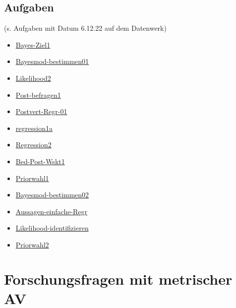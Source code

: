 \documentclass[
  a4paper,
  DIV=11]{scrreprt}
\providecommand{\tightlist}{%
  \setlength{\itemsep}{0pt}\setlength{\parskip}{0pt}}\usepackage{longtable,booktabs,array}
\theoremstyle{definition}
\theoremstyle{remark}
\begin{document}
\hypertarget{aufgaben-7}{%
\section{Aufgaben}\label{aufgaben-7}}

(s. Aufgaben mit Datum 6.12.22 auf dem Datenwerk)

\begin{itemize}
\tightlist
\item
  \href{https://datenwerk.netlify.app/posts/bayes-ziel1/bayes-ziel1}{Bayes-Ziel1}
\item
  \href{https://datenwerk.netlify.app/posts/bayesmod-bestimmen01/bayesmod-bestimmen01}{Bayesmod-bestimmen01}
\item
  \href{https://datenwerk.netlify.app/posts/likelihood2/likelihood2}{Likelihood2}
\item
  \href{https://datenwerk.netlify.app/posts/post-befragen1/post-befragen1}{Post-befragen1}
\item
  \href{https://datenwerk.netlify.app/posts/postvert-regr-01/postvert-regr-01}{Postvert-Regr-01}
\item
  \href{https://datenwerk.netlify.app/posts/regression1a/regression1a.html}{regression1a}
\item
  \href{https://datenwerk.netlify.app/posts/regression2/regression2}{Regression2}
\item
  \href{https://datenwerk.netlify.app/posts/bed-post-wskt1/bed-post-wskt1}{Bed-Post-Wskt1}
\item
  \href{https://datenwerk.netlify.app/posts/priorwahl1/priorwahl1}{Priorwahl1}
\item
  \href{https://datenwerk.netlify.app/posts/bayesmod-bestimmen02/bayesmod-bestimmen02}{Bayesmod-bestimmen02}
\item
  \href{https://datenwerk.netlify.app/posts/aussagen-einfache-regr/aussagen-einfache-regr}{Aussagen-einfache-Regr}
\item
  \href{https://datenwerk.netlify.app/posts/likelihood-identifizieren/likelihood-identifizieren}{Likelihood-identifizieren}
\item
  \href{https://datenwerk.netlify.app/posts/priorwahl2/priorwahl2}{Priorwahl2}
\end{itemize}


\hypertarget{forschungsfragen-mit-metrischer-av}{%
\chapter{Forschungsfragen mit metrischer
AV}\label{forschungsfragen-mit-metrischer-av}}
\end{document}
